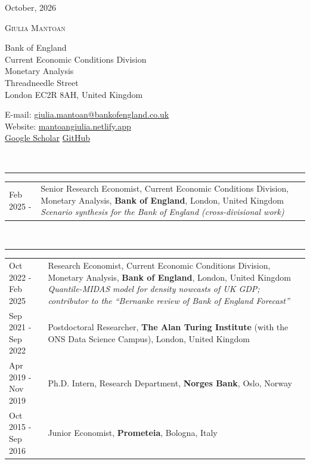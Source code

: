 \documentclass[11pt,a4paper]{article}
\makeatletter
\newcommand{\cvsection}[1]{\vspace{10pt}{\small\bfseries #1}\\[-7pt]\rule{\linewidth}{0.6pt}\vspace{2pt}}
\newenvironment{cvtable}{\small\begin{longtable}{@{}p{3.3cm}p{\dimexpr\linewidth-3.3cm-2\tabcolsep\relax}@{}}}{\end{longtable}\vspace{-14pt}}
\makeatother
\begin{document}
\hfill {\small October, 2026}

\vspace{6pt}
\begin{center}
{\LARGE\scshape Giulia Mantoan}
\end{center}
\vspace{4pt}

{\small
\begin{minipage}[t]{0.55\linewidth}
Bank of England\\
Current Economic Conditions Division\\
Monetary Analysis\\[6pt]
Threadneedle Street\\
London EC2R 8AH, United Kingdom
\end{minipage}%
\begin{minipage}[t]{0.45\linewidth}
E-mail: \href{mailto:giulia.mantoan@bankofengland.co.uk}{giulia.mantoan@bankofengland.co.uk}\\
Website: \href{https://mantoangiulia.netlify.app}{mantoangiulia.netlify.app}\\
\href{https://scholar.google.co.uk/citations?user=EaW6kk8AAAAJ}{Google Scholar} \textperiodcentered{} \href{https://github.com/GiuliaMantoan}{GitHub}
\end{minipage}
}

\vspace{8pt}
\cvsection{Current Employment}
\begin{cvtable}
Feb 2025 - & Senior Research Economist, Current Economic Conditions Division, Monetary Analysis, \textbf{Bank of England}, London, United Kingdom\newline
\textit{Scenario synthesis for the Bank of England (cross-divisional work)} \\
\end{cvtable}

\cvsection{Past Employment}
\begin{cvtable}
Oct 2022 - Feb 2025 & Research Economist, Current Economic Conditions Division, Monetary Analysis, \textbf{Bank of England}, London, United Kingdom\newline
\textit{Quantile-MIDAS model for density nowcasts of UK GDP; contributor to the ``Bernanke review of Bank of England Forecast''} \\
Sep 2021 - Sep 2022 & Postdoctoral Researcher, \textbf{The Alan Turing Institute} (with the ONS Data Science Campus), London, United Kingdom \\
Apr 2019 - Nov 2019 & Ph.D. Intern, Research Department, \textbf{Norges Bank}, Oslo, Norway \\
Oct 2015 - Sep 2016 & Junior Economist, \textbf{Prometeia}, Bologna, Italy \\
\end{cvtable}
\end{document}
